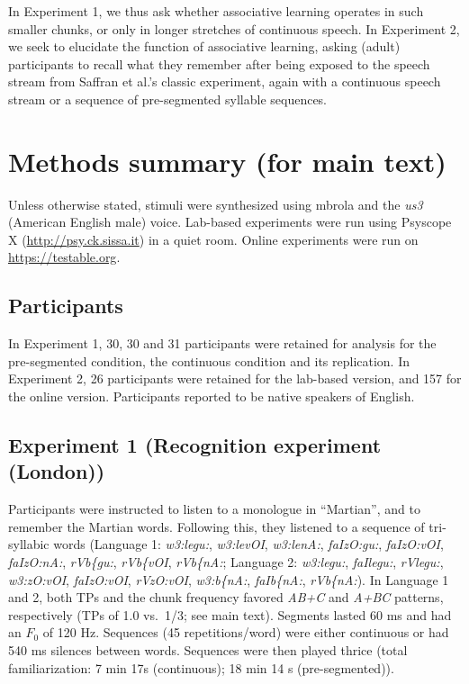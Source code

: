 \documentclass[
]{article}
\begin{document}
In Experiment 1, we thus ask whether associative learning operates in
such smaller chunks, or only in longer stretches of continuous speech.
In Experiment 2, we seek to elucidate the function of associative
learning, asking (adult) participants to recall what they remember after
being exposed to the speech stream from Saffran et al.'s
\citep{Saffran-Science} classic experiment, again with a continuous
speech stream or a sequence of pre-segmented syllable sequences.

\clearpage

\section{Methods summary (for main
text)}\label{methods-summary-for-main-text}

Unless otherwise stated, stimuli were synthesized using mbrola
\citep{mbrola} and the \emph{us3} (American English male) voice.
Lab-based experiments were run using Psyscope X
(\url{http://psy.ck.sissa.it}) in a quiet room. Online experiments were
run on \url{https://testable.org}.

\subsection{Participants}\label{participants}

In Experiment 1, 30, 30 and 31 participants were retained for analysis
for the pre-segmented condition, the continuous condition and its
replication. In Experiment 2, 26 participants were retained for the
lab-based version, and 157 for the online version. Participants reported
to be native speakers of English.

\subsection{Experiment 1 (Recognition experiment
(London))}\label{experiment-1-recognition-experiment-london}

Participants were instructed to listen to a monologue in ``Martian'',
and to remember the Martian words. Following this, they listened to a
sequence of tri-syllabic words (Language 1: \emph{w3:legu:},
\emph{w3:levOI}, \emph{w3:lenA:}, \emph{faIzO:gu:}, \emph{faIzO:vOI},
\emph{faIzO:nA:}, \emph{rVb\{gu:}, \emph{rVb\{vOI}, \emph{rVb\{nA:};
Language 2: \emph{w3:legu:}, \emph{faIlegu:}, \emph{rVlegu:},
\emph{w3:zO:vOI}, \emph{faIzO:vOI}, \emph{rVzO:vOI}, \emph{w3:b\{nA:},
\emph{faIb\{nA:}, \emph{rVb\{nA:}). In Language 1 and 2, both TPs and
the chunk frequency favored \emph{AB+C} and \emph{A+BC} patterns,
respectively (TPs of 1.0 vs.~1/3; see main text). Segments lasted 60 ms
and had an \(F_0\) of 120 Hz. Sequences (45 repetitions/word) were
either continuous or had 540 ms silences between words. Sequences were
then played thrice (total familiarization: 7 min 17s (continuous); 18
min 14 s (pre-segmented)).
\end{document}
